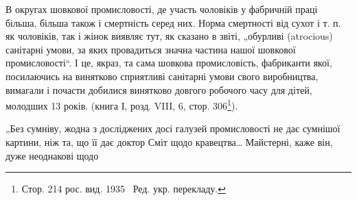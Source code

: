 В округах шовкової промисловості, де участь чоловіків
у фабричній праці більша, більша також і смертність серед них.
Норма смертності від сухот і т. п. як чоловіків, так і жінок
виявляє тут, як сказано в звіті, „обурливі (atrocious) санітарні
умови, за яких провадиться значна частина нашої шовкової
промисловості“. І це, якраз, та сама шовкова промисловість,
фабриканти якої, посилаючись на винятково сприятливі санітарні умови свого виробництва, вимагали і
почасти добилися
винятково довгого робочого часу для дітей, молодших 13 років.
(книга І, розд. VIII, 6, стор. 306\footnote*{Стор. 214 рос. вид. 1935~ Ред. укр. перекладу.}).

„Без сумніву, жодна з досліджених досі галузей промисловості
не дає сумнішої картини, ніж та, що її дає доктор Сміт
щодо кравецтва\dots{} Майстерні, каже він, дуже неоднакові щодо

\parbreak{}  %
